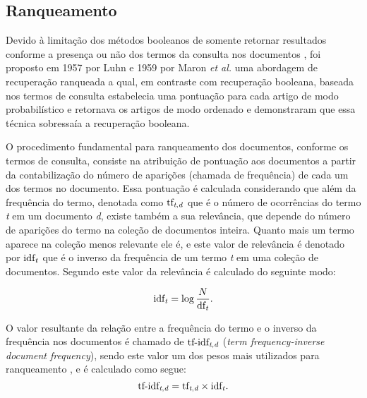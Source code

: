 \subsection{Ranqueamento} \label{subsec:Ranqueamento}
Devido à limitação dos métodos booleanos de somente retornar resultados conforme a presença ou não dos termos da consulta nos documentos \cite[p.~100]{Manning2008IIR}, foi proposto em 1957 por Luhn e 1959 por Maron \textit{et al.} uma abordagem de recuperação ranqueada \cite[p.~1446]{Sanderson2012THIRR} a qual, em contraste com recuperação booleana, baseada nos termos de consulta estabelecia uma pontuação para cada artigo de modo probabilístico e retornava os artigos de modo ordenado e demonstraram que essa técnica sobressaía a recuperação booleana.

O procedimento fundamental para ranqueamento dos documentos, conforme os termos de consulta, consiste na atribuição de pontuação aos documentos a partir da contabilização do número de aparições (chamada de frequência) de cada um dos termos no documento.
Essa pontuação é calculada considerando que além da frequência do termo, denotada como $\text{tf}_{\text{\textit{t},\textit{d}}}$ que é o número de ocorrências do termo \textit{t} em um documento \textit{d}, existe também a sua relevância, que depende do número de aparições do termo na coleção de documentos inteira.
Quanto mais um termo aparece na coleção menos relevante ele é, e este valor de relevância é denotado por $\text{idf}_{\text{\textit{t}}}$ que é o inverso da frequência de um termo \textit{t} em uma coleção de documentos.
Segundo  este valor da relevância é calculado do seguinte modo:

\begin{equation}
    \text{idf}_{\text{\textit{t}}} = \log{\frac{N}{\text{df}_{\text{\textit{t}}}}}.
\end{equation}

O valor resultante da relação entre a frequência do termo e o inverso da frequência nos documentos é chamado de $\text{tf-idf}_{\text{\textit{t},\textit{d}}}$ (\textit{term frequency-inverse document frequency}), sendo este valor um dos pesos mais utilizados para ranqueamento \cite[p.~107--110]{Manning2008IIR}, e é calculado  como segue:
\begin{equation}
    \text{tf-idf}_{\text{\textit{t},\textit{d}}}  = \text{tf}_{\text{\textit{t},\textit{d}}} \times \text{idf}_{\text{\textit{t}}}.
\end{equation}


